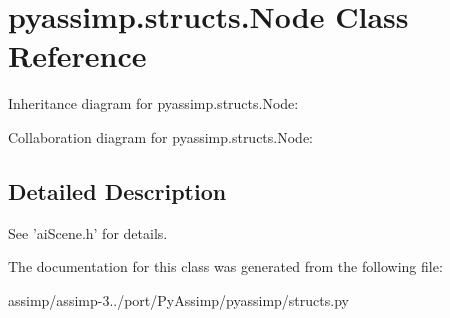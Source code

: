 \hypertarget{classpyassimp_1_1structs_1_1_node}{\section{pyassimp.\+structs.\+Node Class Reference}
\label{classpyassimp_1_1structs_1_1_node}
}


Inheritance diagram for pyassimp.\+structs.\+Node\+:


Collaboration diagram for pyassimp.\+structs.\+Node\+:


\subsection{Detailed Description}
\begin{DoxyVerb}See 'aiScene.h' for details.
\end{DoxyVerb}
 

The documentation for this class was generated from the following file\+:\begin{DoxyCompactItemize}
\item 
assimp/assimp-\/3../port/\+Py\+Assimp/pyassimp/structs.\+py\end{DoxyCompactItemize}
